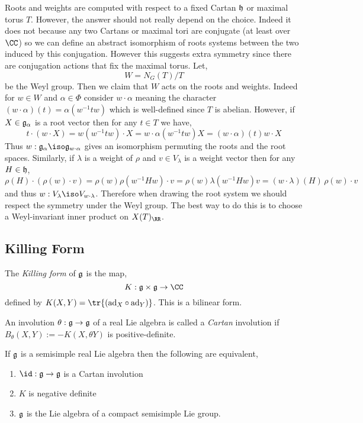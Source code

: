 \documentclass[12pt]{article}
\begin{document}
Roots and weights are computed with respect to a fixed Cartan $\mathfrak{h}$ or maximal torus $T$. However, the answer should not really depend on the choice. Indeed it does not because any two Cartans or maximal tori are conjugate (at least over $\CC$) so we can define an abstract isomorphism of roots systems between the two induced by this conjugation. However this suggests extra symmetry since there are conjugation actions that fix the maximal torus. Let,
\[ W = N_G(T)/T \]
be the Weyl group. Then we claim that $W$ acts on the roots and weights. Indeed for $w \in W$ and $\alpha \in \Phi$ consider $w \cdot \alpha$ meaning the character $(w \cdot \alpha)(t) = \alpha(w^{-1} t w)$ which is well-defined since $T$ is abelian. However, if $X \in \mathfrak{g}_{\alpha}$ is a root vector then for any $t \in T$ we have,
\[ t \cdot (w \cdot X) = w (w^{-1} t w) \cdot X = w \cdot \alpha(w^{-1} t w) X = (w \cdot \alpha)(t) w \cdot X \]
Thus $w : \g_{\alpha} \iso \g_{w \cdot \alpha}$ gives an isomorphism permuting the roots and the root spaces. Similarly, if $\lambda$ is a weight of $\rho$ and $v \in V_\lambda$ is a weight vector then for any $H \in \mathfrak{h}$,
\[ \rho(H) \cdot (\rho(w) \cdot v) = \rho(w) \rho(w^{-1} H w) \cdot v = \rho(w) \lambda(w^{-1} H w) v = (w \cdot \lambda)(H) \, \rho(w) \cdot v \]
and thus $w : V_\lambda \iso V_{w \cdot \lambda}$. Therefore when drawing the root system we should respect the symmetry under the Weyl group. The best way to do this is to choose a Weyl-invariant inner product on $X(T)_{\RR}$.  

\subsection{Killing Form}

\begin{defn}
The \textit{Killing form} of $\mathfrak{g}$ is the map,
\[ K : \g \times \g \to \CC \]
defined by $K(X,Y) = \tr{(\ad_X \circ \ad_Y)}$. This is a bilinear form. 
\end{defn}

\begin{defn}
An involution $\theta : \mathfrak{g} \to \mathfrak{g}$ of a real Lie algebra is called a \textit{Cartan} involution if $B_\theta(X,Y) := -K(X, \theta Y)$ is positive-definite.
\end{defn}

\begin{prop}
If $\mathfrak{g}$ is a semisimple real Lie algebra then the following are equivalent,
\begin{enumerate}
\item $\id : \g \to \g$ is a Cartan involution
\item $K$ is negative definite
\item $\mathfrak{g}$ is the Lie algebra of a compact semisimple Lie group.
\end{enumerate}
\end{prop}
\end{document}
